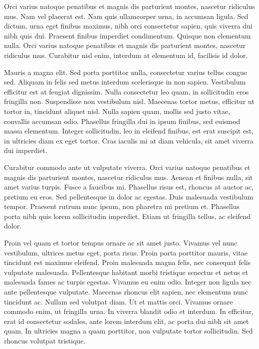 Orci varius natoque penatibus et magnis dis parturient montes, nascetur ridiculus mus. Nam vel placerat est. Nam quis ullamcorper urna, in accumsan ligula. Sed dictum, urna eget finibus maximus, nibh orci consectetur sapien, quis viverra dui nibh quis dui. Praesent finibus imperdiet condimentum. Quisque non elementum nulla. Orci varius natoque penatibus et magnis dis parturient montes, nascetur ridiculus mus. Curabitur nisl enim, interdum at elementum id, facilisis id dolor.

Mauris a magna elit. Sed porta porttitor nulla, consectetur varius tellus congue sed. Aliquam in felis sed metus interdum scelerisque in non sapien. Vestibulum efficitur est at feugiat dignissim. Nulla consectetur leo quam, in sollicitudin eros fringilla non. Suspendisse non vestibulum nisl. Maecenas tortor metus, efficitur ut tortor in, tincidunt aliquet nisl. Nulla sapien quam, mollis sed justo vitae, convallis accumsan odio. Phasellus fringilla dui in ipsum finibus, sed euismod massa elementum. Integer sollicitudin, leo in eleifend finibus, est erat suscipit est, in ultricies diam ex eget tortor. Cras iaculis mi at diam vehicula, sit amet viverra dui imperdiet.

Curabitur commodo ante ut vulputate viverra. Orci varius natoque penatibus et magnis dis parturient montes, nascetur ridiculus mus. Aenean et finibus nulla, sit amet varius turpis. Fusce a faucibus mi. Phasellus risus est, rhoncus at auctor ac, pretium eu eros. Sed pellentesque in dolor ac egestas. Duis malesuada vestibulum tempor. Praesent rutrum nunc ipsum, non pharetra mi pretium et. Phasellus porta nibh quis lorem sollicitudin imperdiet. Etiam ut fringilla tellus, ac eleifend dolor.

Proin vel quam et tortor tempus ornare ac sit amet justo. Vivamus vel nunc vestibulum, ultrices metus eget, porta risus. Proin porta porttitor mauris, vitae tincidunt est maximus eleifend. Proin malesuada magna felis, nec consequat felis vulputate malesuada. Pellentesque habitant morbi tristique senectus et netus et malesuada fames ac turpis egestas. Vivamus eu enim odio. Integer non ligula nec ante pellentesque vulputate. Maecenas rhoncus elit sapien, nec elementum nunc tincidunt ac. Nullam sed volutpat diam. Ut et mattis orci. Vivamus ornare commodo enim, ut fringilla urna. In viverra blandit odio et interdum. In efficitur, erat id consectetur sodales, ante lorem interdum elit, ac porta dui nibh sit amet quam. In ultricies magna a quam porttitor, non vulputate tortor sollicitudin. Sed rhoncus volutpat tristique.

